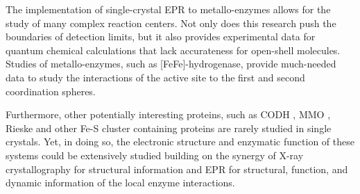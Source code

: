 The implementation of single-crystal EPR to metallo-enzymes allows for the study of many complex reaction centers. \cite{holm2014introduction} Not only does this research push the boundaries of detection limits, but it also provides experimental data for quantum chemical calculations that lack accurateness for open-shell molecules. Studies of metallo-enzymes, such as [FeFe]-hydrogenase, provide much-needed data to study the interactions of the active site to the first and second coordination spheres. 

Furthermore, other potentially interesting proteins, such as CODH \cite{C5CS00182J}, MMO \cite{Hoffman2014rev}, Rieske \cite{FERRARO2005175} and other Fe-S cluster containing proteins \cite{FeSClustersReview} are rarely studied in single crystals. Yet, in doing so, the electronic structure and enzymatic function of these systems could be extensively studied building on the synergy of X-ray crystallography for structural information and EPR for structural, function, and dynamic information of the local enzyme interactions.  


{\renewcommand{\bibsection}{\clearpage\section*{\bibname}\markboth{\bibname}{\bibname}}
\renewcommand{\bibname}{REFERENCES}


}